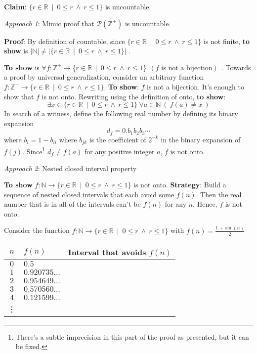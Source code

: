 \documentclass[12pt, oneside]{article}
\begin{document}
\newpage 

{\bf Claim}: $\{  r \in \mathbb{R} ~\mid~ 0 \leq r ~\wedge~ r \leq 1 \}$ is uncountable.

{\it Approach 1}: Mimic proof that $\mathcal{P}(\mathbb{Z}^+)$ is uncountable.


{\bf Proof}:  By definition of countable, since $\{  r \in \mathbb{R} ~\mid~ 0 \leq r ~\wedge~ r \leq 1 \}$
is not finite, {\bf to show} is $|\mathbb{N}| \neq  |\{  r \in \mathbb{R} ~\mid~ 0 \leq r ~\wedge~ r \leq 1 \}|$ .


{\bf To show} is
$\forall f : \mathbb{Z}^+ \to \{  r \in \mathbb{R} ~\mid~ 0 \leq r ~\wedge~ r \leq 1 \}  ~~(f \text{ is not a bijection})~~$.
Towards a proof by  universal generalization, consider  an arbitrary function 
$f:  \mathbb{Z}^+ \to \{  r \in \mathbb{R} ~\mid~ 0 \leq r ~\wedge~ r \leq 1 \}$.
{\bf To show}: $f$ is not a bijection.  It's enough to show that $f$ is not onto.
Rewriting using the definition of  onto, {\bf to show}:
\[
\exists x \in \{  r \in \mathbb{R} ~\mid~ 0 \leq r ~\wedge~ r \leq 1 \} ~\forall a \in \mathbb{N}  ~(~f(a) \neq  x~)
\]
In search of a witness, define the following  real number by defining its binary expansion
\[
d_f = 0.b_1 b_2 b_3 \cdots
\]
where $b_i = 1-b_{ii}$ where $b_{jk}$ is the coefficient of $2^{-k}$ in the binary expansion of $f(j)$.
Since\footnote{There's a subtle imprecision in this part of the proof as presented, but it can be fixed.} $d_f \neq f(a)$ for any positive integer $a$, $f$ is not onto.


{\it Approach 2}: Nested closed interval property

{\bf To show} $f: \mathbb{N} \to \{  r \in \mathbb{R} ~\mid~ 0  \leq r ~\wedge~ r \leq 1 \}$ is not onto. 
{\bf  Strategy}: Build
a sequence of nested closed intervals that each avoid some $f(n)$.   Then  the real
number that is in all of the intervals  can't be $f(n)$ for any $n$. Hence,  $f$ is not  onto.

Consider the function $f: \mathbb{N} \to \{  r \in \mathbb{R} ~\mid~ 0 \leq r ~\wedge~ r \leq 1 \}$ with  $f(n) = \frac{1+\sin(n)}{2}$

\begin{center}
\begin{tabular}{c||p{1.65in} || p{3in} }
$n$ &  $f(n)$& Interval that avoids $f(n)$ \\
\hline
$0$ & $0.5$ &  \\
$1$ &$0.920735\ldots$  &  \\
$2$ &$0.954649\ldots$ &  \\
$3$ &$0.570560\ldots$ & \\
$4$ &$0.121599\ldots $&  \\
\vdots &  &\\
\end{tabular}
\end{center}
\end{document}
